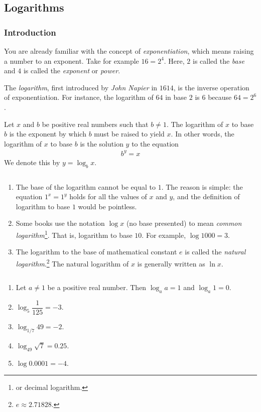 \subsection{Logarithms}\label{sec:logarithm}
\subsubsection{Introduction}
You are already familiar with the concept of \textit{exponentiation}, which means raising a number to an exponent. Take for example $16=2^4$. Here, $2$ is called the \textit{base} and $4$ is called the \textit{exponent} or \textit{power}.

The \textit{logarithm}, first introduced by \textit{John Napier} in $1614$, is the inverse operation of exponentiation. For instance, the logarithm of $64$ in base $2$ is $6$ because $64=2^6$.

\begin{definition}
	Let $x$ and $b$ be positive real numbers such that $b \neq 1$. The logarithm of $x$ to base $b$ is the exponent by which $b$ must be raised to yield $x$.  In other words, the logarithm of $x$ to base $b$ is the solution $y$ to the equation
	\begin{align*}
		b^y = x
	\end{align*}
	We denote this by $y = \log_b x$.
\end{definition}

\begin{remark}
	$ $
	\begin{enumerate}
		\item The base of the logarithm cannot be equal to $1$. The reason is simple: the equation $1^x = 1^y$ holds for all the values of $x$ and $y$, and the definition of logarithm to base $1$ would be pointless.

		\item Some books use the notation $\log x$ (no base presented) to mean \textit{common logarithm}\footnote{or decimal logarithm.}. That is, logarithm to base $10$. For example, $\log 1000=3$.

		\item The logarithm to the base of mathematical constant $e$ is called the \textit{natural logarithm}.\footnote{$e\approx 2.71828.$} The natural logarithm of $x$ is generally written as $\ln x$.
	\end{enumerate}
\end{remark}

\begin{example}
	$ $
	\begin{enumerate}
		\item Let $a \neq 1$ be a positive real number. Then $\log_a a=1$ and $\log_a 1 = 0$.
		\item $\log_5 \dfrac{1}{125}=-3$.
		\item $\log_{1/7} 49 = -2$.
		\item $\log_{49} \sqrt 7 = 0.25$.
		\item $\log 0.0001 = -4$.
	\end{enumerate}
\end{example}
